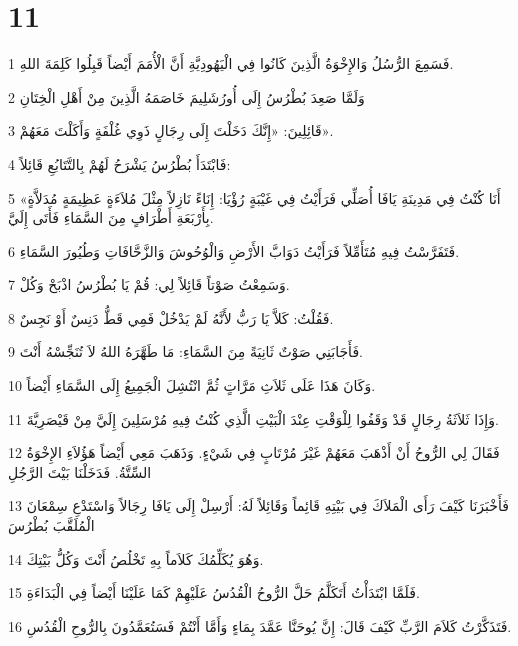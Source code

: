 \chapter{11}

\par 1 فَسَمِعَ الرُّسُلُ وَالإِخْوَةُ الَّذِينَ كَانُوا فِي الْيَهُودِيَّةِ أَنَّ الْأُمَمَ أَيْضاً قَبِلُوا كَلِمَةَ اللهِ.
\par 2 وَلَمَّا صَعِدَ بُطْرُسُ إِلَى أُورُشَلِيمَ خَاصَمَهُ الَّذِينَ مِنْ أَهْلِ الْخِتَانِ
\par 3 قَائِلِينَ: «إِنَّكَ دَخَلْتَ إِلَى رِجَالٍ ذَوِي غُلْفَةٍ وَأَكَلْتَ مَعَهُمْ».
\par 4 فَابْتَدَأَ بُطْرُسُ يَشْرَحُ لَهُمْ بِالتَّتَابُعِ قَائِلاً:
\par 5 «أَنَا كُنْتُ فِي مَدِينَةِ يَافَا أُصَلِّي فَرَأَيْتُ فِي غَيْبَةٍ رُؤْيَا: إِنَاءً نَازِلاً مِثْلَ مُلاَءَةٍ عَظِيمَةٍ مُدَلاَّةٍ بِأَرْبَعَةِ أَطْرَافٍ مِنَ السَّمَاءِ فَأَتَى إِلَيَّ.
\par 6 فَتَفَرَّسْتُ فِيهِ مُتَأَمِّلاً فَرَأَيْتُ دَوَابَّ الأَرْضِ وَالْوُحُوشَ وَالزَّحَّافَاتِ وَطُيُورَ السَّمَاءِ.
\par 7 وَسَمِعْتُ صَوْتاً قَائِلاً لِي: قُمْ يَا بُطْرُسُ اذْبَحْ وَكُلْ.
\par 8 فَقُلْتُ: كَلاَّ يَا رَبُّ لأَنَّهُ لَمْ يَدْخُلْ فَمِي قَطُّ دَنِسٌ أَوْ نَجِسٌ.
\par 9 فَأَجَابَنِي صَوْتٌ ثَانِيَةً مِنَ السَّمَاءِ: مَا طَهَّرَهُ اللهُ لاَ تُنَجِّسْهُ أَنْتَ.
\par 10 وَكَانَ هَذَا عَلَى ثَلاَثِ مَرَّاتٍ ثُمَّ انْتُشِلَ الْجَمِيعُ إِلَى السَّمَاءِ أَيْضاً.
\par 11 وَإِذَا ثَلاَثَةُ رِجَالٍ قَدْ وَقَفُوا لِلْوَقْتِ عِنْدَ الْبَيْتِ الَّذِي كُنْتُ فِيهِ مُرْسَلِينَ إِلَيَّ مِنْ قَيْصَرِيَّةَ.
\par 12 فَقَالَ لِي الرُّوحُ أَنْ أَذْهَبَ مَعَهُمْ غَيْرَ مُرْتَابٍ فِي شَيْءٍ. وَذَهَبَ مَعِي أَيْضاً هَؤُلاَءِ الإِخْوَةُ السِّتَّةُ. فَدَخَلْنَا بَيْتَ الرَّجُلِ
\par 13 فَأَخْبَرَنَا كَيْفَ رَأَى الْمَلاَكَ فِي بَيْتِهِ قَائِماً وَقَائِلاً لَهُ: أَرْسِلْ إِلَى يَافَا رِجَالاً وَاسْتَدْعِ سِمْعَانَ الْمُلَقَّبَ بُطْرُسَ
\par 14 وَهُوَ يُكَلِّمُكَ كَلاَماً بِهِ تَخْلُصُ أَنْتَ وَكُلُّ بَيْتِكَ.
\par 15 فَلَمَّا ابْتَدَأْتُ أَتَكَلَّمُ حَلَّ الرُّوحُ الْقُدُسُ عَلَيْهِمْ كَمَا عَلَيْنَا أَيْضاً فِي الْبَدَاءَةِ.
\par 16 فَتَذَكَّرْتُ كَلاَمَ الرَّبِّ كَيْفَ قَالَ: إِنَّ يُوحَنَّا عَمَّدَ بِمَاءٍ وَأَمَّا أَنْتُمْ فَسَتُعَمَّدُونَ بِالرُّوحِ الْقُدُسِ.
